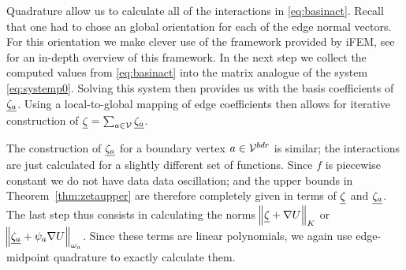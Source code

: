 \documentclass[thesis.tex]{subfiles}
\begin{document}
  Quadrature allow us to calculate all of the interactions in \eqref{eq:basinact}.
  Recall that one had to chose an global orientation for each of the edge normal vectors. For this orientation we make clever
  use of the framework provided by iFEM, see \cite{chenifem} for an in-depth overview of this framework. In the next step we collect
  the computed values from \eqref{eq:basinact} into the matrix analogue of the system \eqref{eq:systemp0}. Solving
  this system then provides us with the basis coefficients of $\underline{\zeta_a}$. Using a local-to-global mapping of edge coefficients
  then allows for iterative construction of $\underline{\zeta} = \sum_{a \in \mathcal{V}} \underline{\zeta_a}$. 

  The construction of $\underline{\zeta_a}$ for a boundary vertex $a \in \mathcal{V}^{bdr}$ is similar; the interactions
  are just calculated for a slightly different set of functions. Since $f$ is piecewise constant
  we do not have data data oscillation; and the upper bounds in Theorem~\ref{thm:zetaupper} are therefore completely given in terms of $\underline{\zeta}$ and 
  $\underline{\zeta_a}$. The last step thus consists in calculating the norms $\norm{\underline{\zeta} + \nabla U}_K$ or $\norm{\underline{\zeta_a} + \psi_a \nabla U}_{\omega_a}$.
  Since these terms are linear polynomials, we again use edge-midpoint quadrature to exactly calculate them. 
\end{document}
